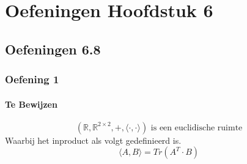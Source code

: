 \documentclass[lineaire_algebra_oplossingen.tex]{subfiles}
\begin{document}
\chapter{Oefeningen Hoofdstuk 6}

\section{Oefeningen 6.8}


\subsection{Oefening 1}
\subsubsection*{Te Bewijzen}
\[
(\mathbb{R},\mathbb{R}^{2\times 2},+,\langle \cdot,\cdot \rangle ) \text{ is een euclidische ruimte}
\]
Waarbij het inproduct als volgt gedefinieerd is.
\[
\langle A,B \rangle = Tr(A^T\cdot B)
\]
\end{document}

